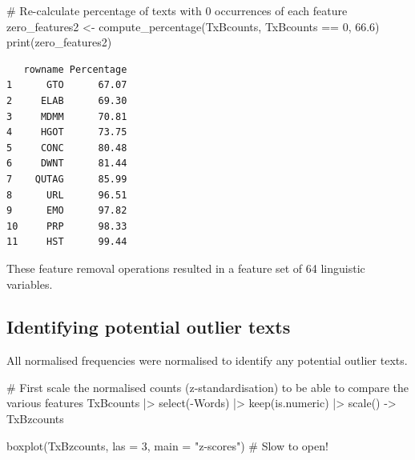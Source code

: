 \documentclass[
  letterpaper,
  DIV=11,
  numbers=noendperiod]{scrreprt}
\newenvironment{Shaded}{\begin{snugshade}}{\end{snugshade}}
\newcommand{\AttributeTok}[1]{\textcolor[rgb]{0.40,0.45,0.13}{#1}}
\newcommand{\CommentTok}[1]{\textcolor[rgb]{0.37,0.37,0.37}{#1}}
\newcommand{\DecValTok}[1]{\textcolor[rgb]{0.68,0.00,0.00}{#1}}
\newcommand{\FloatTok}[1]{\textcolor[rgb]{0.68,0.00,0.00}{#1}}
\newcommand{\FunctionTok}[1]{\textcolor[rgb]{0.28,0.35,0.67}{#1}}
\newcommand{\NormalTok}[1]{\textcolor[rgb]{0.00,0.23,0.31}{#1}}
\newcommand{\OtherTok}[1]{\textcolor[rgb]{0.00,0.23,0.31}{#1}}
\newcommand{\SpecialCharTok}[1]{\textcolor[rgb]{0.37,0.37,0.37}{#1}}
\newcommand{\StringTok}[1]{\textcolor[rgb]{0.13,0.47,0.30}{#1}}
\begin{document}
\begin{Shaded}
\begin{Highlighting}[]
\CommentTok{\# Re{-}calculate percentage of texts with 0 occurrences of each feature}
\NormalTok{zero\_features2 }\OtherTok{\textless{}{-}} \FunctionTok{compute\_percentage}\NormalTok{(TxBcounts, TxBcounts }\SpecialCharTok{==} \DecValTok{0}\NormalTok{, }\FloatTok{66.6}\NormalTok{)}
\FunctionTok{print}\NormalTok{(zero\_features2)}
\end{Highlighting}
\end{Shaded}

\begin{verbatim}
   rowname Percentage
1      GTO      67.07
2     ELAB      69.30
3     MDMM      70.81
4     HGOT      73.75
5     CONC      80.48
6     DWNT      81.44
7    QUTAG      85.99
8      URL      96.51
9      EMO      97.82
10     PRP      98.33
11     HST      99.44
\end{verbatim}

\begin{Shaded}
\end{Shaded}

These feature removal operations resulted in a feature set of 64
linguistic variables.

\subsection{Identifying potential outlier
texts}\label{identifying-potential-outlier-texts}

All normalised frequencies were normalised to identify any potential
outlier texts.

\begin{Shaded}
\begin{Highlighting}[]
\CommentTok{\# First scale the normalised counts (z{-}standardisation) to be able to compare the various features}
\NormalTok{TxBcounts }\SpecialCharTok{|\textgreater{}} 
  \FunctionTok{select}\NormalTok{(}\SpecialCharTok{{-}}\NormalTok{Words) }\SpecialCharTok{|\textgreater{}}  
  \FunctionTok{keep}\NormalTok{(is.numeric) }\SpecialCharTok{|\textgreater{}}  
  \FunctionTok{scale}\NormalTok{() }\OtherTok{{-}\textgreater{}}
\NormalTok{  TxBzcounts}

\FunctionTok{boxplot}\NormalTok{(TxBzcounts, }\AttributeTok{las =} \DecValTok{3}\NormalTok{, }\AttributeTok{main =} \StringTok{"z{-}scores"}\NormalTok{) }\CommentTok{\# Slow to open!}
\end{Highlighting}
\end{Shaded}
\end{document}
